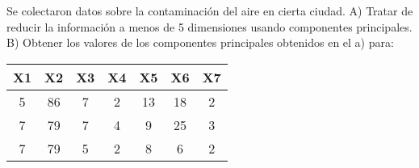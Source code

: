 \documentclass[12pt]{article}
\newenvironment{problem}[2][Problema]{\begin{trivlist}
\item[\hskip \labelsep {\bfseries #1}\hskip \labelsep {\bfseries #2.}]}{\end{trivlist}}
\begin{document}


\begin{problem}{2}
Se colectaron datos sobre la contaminación del aire en cierta ciudad.
A) Tratar de reducir la información a menos de 5 dimensiones usando componentes principales.
B) Obtener los valores de los componentes principales obtenidos en el a) para:
\begin{table}[h]
    \centering
    \begin{tabular}{|c|c|c|c|c|c|c|}
        \hline
        \textbf{X1} & \textbf{X2} & \textbf{X3} & \textbf{X4} & \textbf{X5} & \textbf{X6} & \textbf{X7} \\
        \hline
        5 & 86 & 7 & 2 & 13 & 18 & 2 \\
        7 & 79 & 7 & 4 & 9 & 25 & 3 \\
        7 & 79 & 5 & 2 & 8 & 6 & 2 \\
        \hline
    \end{tabular}
    \label{tab:datos}
\end{table}
\end{problem}
\end{document}
